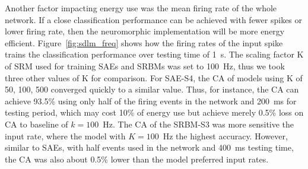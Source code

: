 Another factor impacting energy use was the mean firing rate of the whole network.
If a close classification performance can be achieved with fewer spikes or \protect{} lower firing rate, then the neuromorphic implementation will be more energy efficient.
Figure~\ref{fig:sdlm_freq} shows how the firing rates of the input spike trains \protect{} \protect{} the classification performance over testing time of 1~s.
The scaling factor K of SRM used for training SAEs and SRBMs was set to 100~Hz, thus we took three other values of K for comparison.
For SAE-S4, the CA of models using K of 50, 100, 500 converged quickly to a similar value.
Thus, for instance, the CA can achieve 93.5\% using only half of the firing events in the network and 200~ms for testing period, which may cost 10\% of energy use but achieve merely 0.5\% loss on CA \protect{} \protect{} to \protect{} baseline of $k=100$~Hz.
The CA of the SRBM-S3 was more sensitive \protect{} \protect{} the input rate, where the model with $K=100$~Hz \protect{} \protect{} the highest accuracy.
However, similar to SAEs, with half \protect{} events used in the network and 400~ms testing time, the CA was also about 0.5\% lower than the model \protect{} \protect{} preferred input rates.

